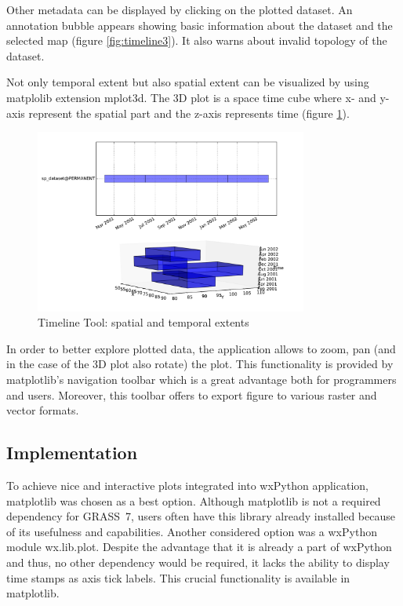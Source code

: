 \documentclass[a4paper,12pt,oneside]{book}
\begin{document}
Other metadata can be displayed by clicking on the plotted dataset.
An annotation bubble appears showing basic information about the dataset and the selected map (figure \ref{fig:timeline3}).
It also warns about invalid topology of the dataset.


Not only temporal extent but also spatial extent can be visualized by using matplolib extension mplot3d.
The 3D plot is a space time cube where x- and y-axis represent the spatial part and the z-axis represents time (figure \ref{fig:timeline2}).

\begin{figure}[ht!]
  \centering
  \includegraphics[width=0.8\textwidth]{./images/timeline2.pdf}
  \caption{Timeline Tool: spatial and temporal extents}
  \label{fig:timeline2}
\end{figure}

In order to better explore plotted data, the application allows to zoom,
pan (and in the case of the 3D plot also rotate) the plot.
This functionality is provided by matplotlib's navigation toolbar which is a great advantage both for programmers and users.
Moreover, this toolbar offers to export figure to various raster and vector formats.

\subsection{Implementation}
To achieve nice and interactive plots integrated into wxPython application, matplotlib was chosen as a best option.
Although matplotlib is not a required dependency for GRASS~7,
users often have this library already installed because of its usefulness and capabilities.
Another considered option was a wxPython module wx.lib.plot.
Despite the advantage that it is already a part of wxPython and thus, no other dependency would be required,
it lacks the ability to display time stamps as axis tick labels. This crucial functionality is available in matplotlib.
\end{document}
